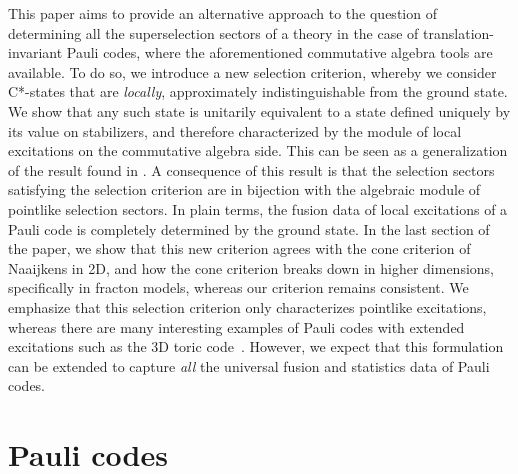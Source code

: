 \documentclass[11pt]{amsart}
\begin{document}
\par This paper aims to provide an alternative approach to the question of determining all the superselection sectors of a theory in the case of translation-invariant Pauli codes, where the aforementioned commutative algebra tools are available. 
To do so, we introduce a new selection criterion, whereby we consider C*-states that are \textit{locally}, approximately indistinguishable from the ground state. We show that any such state is unitarily equivalent to a state defined uniquely by its value on stabilizers, and therefore characterized by the module of local excitations on the commutative algebra side. This can be seen as a generalization of the result found in \cite{cha_naaijkens_nachtergaele_2018}. A consequence of this result is that the selection sectors satisfying the selection criterion are in bijection with the algebraic module of pointlike selection sectors. In plain terms, the fusion data of local excitations of a Pauli code is completely determined by the ground state. In the last section of the paper, we show that this new criterion agrees with the cone criterion of Naaijkens in 2D, and how the cone criterion breaks down in higher dimensions, specifically in fracton models, whereas our criterion remains consistent. We emphasize that this selection criterion only characterizes pointlike excitations, whereas there are many interesting examples of Pauli codes with extended excitations such as the 3D toric code~\cite{hamma_zanardi_wen_2005,vadnerkar_2023}. However, we expect that this formulation can be extended to capture \textit{all} the universal fusion and statistics data of Pauli codes. 
\section{Pauli codes}
\end{document}

